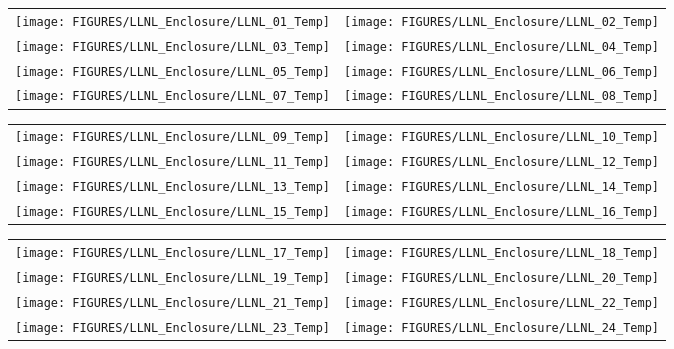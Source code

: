 \begin{figure}[p]
\begin{tabular*}{\textwidth}{l@{\extracolsep{\fill}}r}
\texttt{[image: FIGURES/LLNL\_Enclosure/LLNL\_01\_Temp]} &
\texttt{[image: FIGURES/LLNL\_Enclosure/LLNL\_02\_Temp]} \\
\texttt{[image: FIGURES/LLNL\_Enclosure/LLNL\_03\_Temp]} &
\texttt{[image: FIGURES/LLNL\_Enclosure/LLNL\_04\_Temp]} \\
\texttt{[image: FIGURES/LLNL\_Enclosure/LLNL\_05\_Temp]} &
\texttt{[image: FIGURES/LLNL\_Enclosure/LLNL\_06\_Temp]} \\
\texttt{[image: FIGURES/LLNL\_Enclosure/LLNL\_07\_Temp]} &
\texttt{[image: FIGURES/LLNL\_Enclosure/LLNL\_08\_Temp]}
\end{tabular*}
\label{LLNL_Enclosure_Temp_1}
\end{figure}

\begin{figure}[p]
\begin{tabular*}{\textwidth}{l@{\extracolsep{\fill}}r}
\texttt{[image: FIGURES/LLNL\_Enclosure/LLNL\_09\_Temp]} &
\texttt{[image: FIGURES/LLNL\_Enclosure/LLNL\_10\_Temp]} \\
\texttt{[image: FIGURES/LLNL\_Enclosure/LLNL\_11\_Temp]} &
\texttt{[image: FIGURES/LLNL\_Enclosure/LLNL\_12\_Temp]} \\
\texttt{[image: FIGURES/LLNL\_Enclosure/LLNL\_13\_Temp]} &
\texttt{[image: FIGURES/LLNL\_Enclosure/LLNL\_14\_Temp]} \\
\texttt{[image: FIGURES/LLNL\_Enclosure/LLNL\_15\_Temp]} &
\texttt{[image: FIGURES/LLNL\_Enclosure/LLNL\_16\_Temp]}
\end{tabular*}
\label{LLNL_Enclosure_Temp_2}
\end{figure}

\begin{figure}[p]
\begin{tabular*}{\textwidth}{l@{\extracolsep{\fill}}r}
\texttt{[image: FIGURES/LLNL\_Enclosure/LLNL\_17\_Temp]} &
\texttt{[image: FIGURES/LLNL\_Enclosure/LLNL\_18\_Temp]} \\
\texttt{[image: FIGURES/LLNL\_Enclosure/LLNL\_19\_Temp]} &
\texttt{[image: FIGURES/LLNL\_Enclosure/LLNL\_20\_Temp]} \\
\texttt{[image: FIGURES/LLNL\_Enclosure/LLNL\_21\_Temp]} &
\texttt{[image: FIGURES/LLNL\_Enclosure/LLNL\_22\_Temp]} \\
\texttt{[image: FIGURES/LLNL\_Enclosure/LLNL\_23\_Temp]} &
\texttt{[image: FIGURES/LLNL\_Enclosure/LLNL\_24\_Temp]}
\end{tabular*}
\label{LLNL_Enclosure_Temp_3}
\end{figure}


